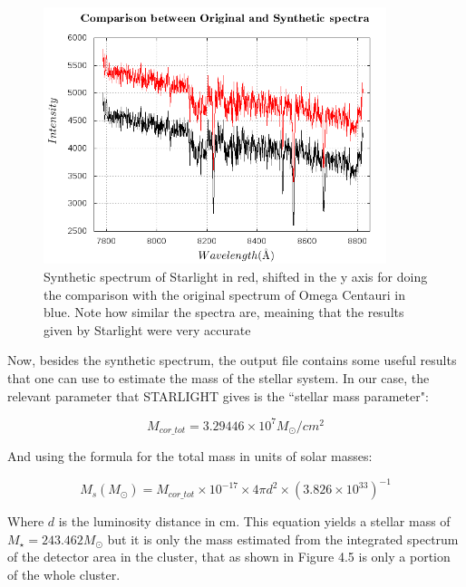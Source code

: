 \begin{figure}[]
\centering
\includegraphics[width=10cm]{images/comparison.png}
\caption[Synthetic spectrum of STARLIGHT]{Synthetic spectrum of Starlight in red, shifted in the y axis for doing the comparison with the original spectrum of Omega Centauri in blue. Note how similar the spectra are, meaining that the results given by Starlight were very accurate}
\end{figure}
 
Now, besides the synthetic spectrum, the output file contains some useful results that one can use to estimate the mass of the stellar system. In our case, the relevant parameter that STARLIGHT gives is the ``stellar mass parameter":

\begin{equation}
M_{cor\_tot} = 3.29446 \times 10^{7} M_{\odot}/cm^{2}
\end{equation}

And using the formula for the total mass in units of solar masses:

\begin{equation}
M_{s}(M_{\odot})=M_{cor\_tot}\times10^{-17}\times4\pi d^{2}\times\left(3.826\times10^{33}\right)^{-1}
\end{equation}

Where $d$ is the luminosity distance in cm. This equation yields a stellar mass of $M_{\star}=243.462M_{\odot}$ but it is only the mass estimated from the integrated spectrum of the detector area in the cluster, that as shown in Figure 4.5 is only a portion of the whole cluster.

